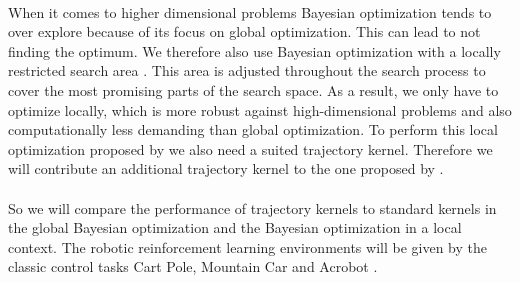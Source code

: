 \\
When it comes to higher dimensional problems Bayesian optimization tends to over explore because of its focus on global optimization. This can lead to not finding the optimum. We therefore also use Bayesian optimization with a locally restricted search area \cite{akrour2017local}. This area is adjusted throughout the search process to cover the most promising parts of the search space. As a result, we only have to optimize locally, which is more robust against high-dimensional problems and also computationally less demanding than global optimization. To perform this local optimization proposed by \cite{akrour2017local} we also need a suited trajectory kernel. Therefore we will contribute an additional trajectory kernel to the one proposed by \cite{wilson2014using}.\\
\\
So we will compare the performance of trajectory kernels to standard kernels in the global Bayesian optimization and the Bayesian optimization in a local context. The robotic reinforcement learning environments will be given by the classic control tasks Cart Pole, Mountain Car and Acrobot \cite{sutton1998reinforcement}.\\
